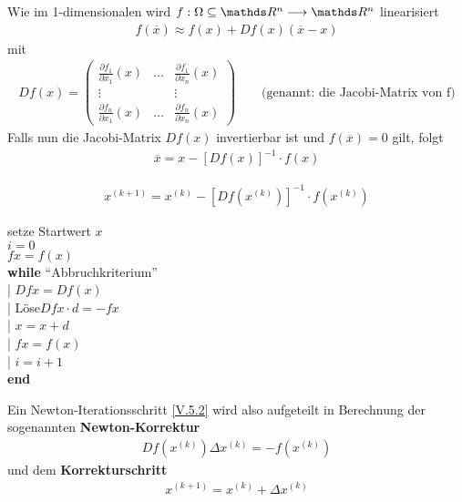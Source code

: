  
Wie im 1-dimensionalen wird $f:\Omega\subseteq \R^n \longrightarrow\R^n$
linearisiert 
\begin{gather}
  f(\overline{x}) \approx f(x) +Df(x)(\overline{x}-x)
  \label{V.5.1}
\end{gather}
mit
\begin{gather*}
  Df(x) = \begin{pmatrix}
    \frac{\partial f_1}{\partial x_1}(x) &\dots & \frac{\partial f_1}{\partial x_n}(x)\\
    \vdots && \vdots\\
    \frac{\partial f_n}{\partial x_1}(x) &\dots & \frac{\partial f_n}{\partial x_n}(x)
  \end{pmatrix}
  \qquad \text{(genannt: die Jacobi-Matrix von f)}
\end{gather*}
Falls nun die Jacobi-Matrix $Df(x)$ invertierbar ist und $f(\overline{x})= 0$ gilt, folgt
\begin{gather*}
  \overline{x} = x-[Df(x)]^{-1}\cdot f(x)
\end{gather*}

\begin{gather}
  x^{(k+1)} = x^{(k)} -[Df(x^{(k)})]^{-1}\cdot f(x^{(k)})
  \label{V.5.2}
\end{gather}

\begin{pseudocode}{0.5\linewidth}
  setze Startwert $x$ \\
  $i=0$ \\
  $fx= f(x)$ \\
  \textbf{while} \enquote{Abbruchkriterium} \\
  |	\> $Dfx = Df(x)$ \\
  |	\> Löse\footnotemark $Dfx\cdot d=-fx$ \\
  |	\> $x=x+d$ \\
  |	\> $fx=f(x)$\\
  |	\> $i=i+1$\\
  \textbf{end}
\end{pseudocode}

\begin{Beme}
  Ein Newton-Iterationsschritt \eqref{V.5.2} wird also aufgeteilt in Berechnung
  der sogenannten \textbf{Newton-Korrektur}
  \begin{gather}
    Df(x^{(k)})\Delta x^{(k)} = -f(x^{(k)}) \label{V.5.3}
  \end{gather}
  und dem \textbf{Korrekturschritt}
  \begin{gather}
    x^{(k+1)}= x^{(k)}+\Delta x^{(k)} \label{V.5.4}
  \end{gather}
\end{Beme}


